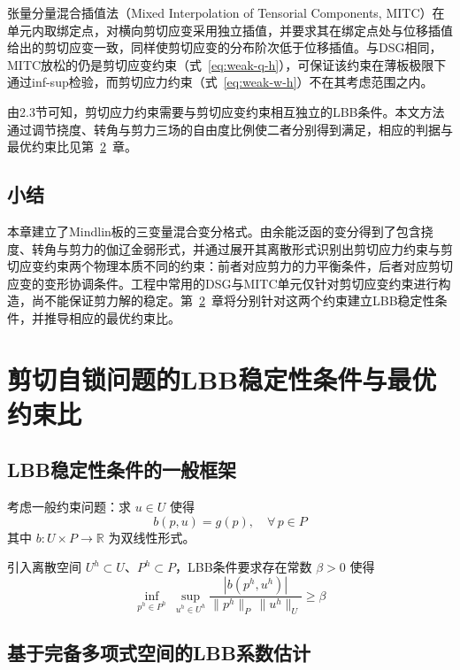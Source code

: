 \documentclass[internationalmaster]{hquThesis}
\begin{document}
张量分量混合插值法（Mixed Interpolation of Tensorial Components, MITC）在单元内取绑定点，对横向剪切应变采用独立插值，并要求其在绑定点处与位移插值给出的剪切应变一致，同样使剪切应变的分布阶次低于位移插值\cite{bathe1985}。与DSG相同，MITC放松的仍是剪切应变约束（式~\eqref{eq:weak-q-h}），可保证该约束在薄板极限下通过inf-sup检验，而剪切应力约束（式~\eqref{eq:weak-w-h}）不在其考虑范围之内。

由2.3节可知，剪切应力约束需要与剪切应变约束相互独立的LBB条件。本文方法通过调节挠度、转角与剪力三场的自由度比例使二者分别得到满足，相应的判据与最优约束比见第~\ref{ch:lbb}~章。

\section{小结}

本章建立了Mindlin板的三变量混合变分格式。由余能泛函的变分得到了包含挠度、转角与剪力的伽辽金弱形式，并通过展开其离散形式识别出剪切应力约束与剪切应变约束两个物理本质不同的约束：前者对应剪力的力平衡条件，后者对应剪切应变的变形协调条件。工程中常用的DSG与MITC单元仅针对剪切应变约束进行构造，尚不能保证剪力解的稳定。第~\ref{ch:lbb}~章将分别针对这两个约束建立LBB稳定性条件，并推导相应的最优约束比。

\chapter{剪切自锁问题的LBB稳定性条件与最优约束比}
\label{ch:lbb}

\section{LBB稳定性条件的一般框架}

考虑一般约束问题：求 $u\in U$ 使得
\begin{equation}
    b(p,u) = g(p), \quad \forall\,p\in P
    \label{eq:constraint-problem}
\end{equation}
其中 $b:U\times P\to\mathbb{R}$ 为双线性形式。

引入离散空间 $U^{h}\subset U$、$P^{h}\subset P$，LBB条件要求存在常数 $\beta>0$ 使得
\begin{equation}
    \inf_{p^{h}\in P^{h}}\ \sup_{u^{h}\in U^{h}}
    \frac{|b(p^{h},u^{h})|}{\| p^{h}\|_P\,\| u^{h}\|_U} \geq \beta
    \label{eq:lbb-def}
\end{equation}

\section{基于完备多项式空间的LBB系数估计}
\end{document}
